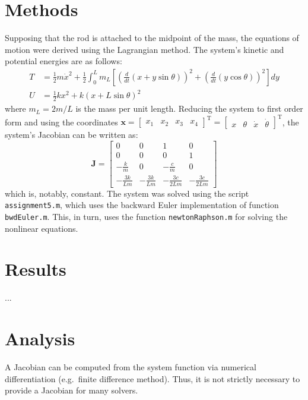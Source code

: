 \documentclass{article}
\begin{document}
	\section*{Methods}
	Supposing that the rod is attached to the midpoint of the mass, the equations of motion were derived using the Lagrangian method. The system's kinetic and potential energies are as follows:
	\begin{equation}
		\begin{aligned}
		T &= \frac{1}{2} m \dot{x}^2 + \frac{1}{2} \int_{0}^{L} m_L \left[ \left( \frac{d}{dt} (x + y \sin \theta) \right)^2 + \left( \frac{d}{dt} (y \cos \theta) \right)^2 \right] dy \\
		U &= \frac{1}{2} k x^2 + k (x + L \sin \theta)^2
		\end{aligned}
	\end{equation}
	where $m_L = 2 m / L$ is the mass per unit length. Reducing the system to first order form and using the coordinates $\bm{x} = \begin{bmatrix} x_1 & x_2 & x_3 & x_4 \end{bmatrix}^\text{T} = \begin{bmatrix} x & \theta & \dot{x} & \dot{\theta} \end{bmatrix}^\text{T}$, the system's Jacobian can be written as:
	\begin{equation}
		\mathbf{J} = \begin{bmatrix}
		0 & 0 & 1 & 0 \\
		0 & 0 & 0 & 1 \\
		-\frac{k}{m} & 0 & -\frac{c}{m} & 0 \\
		-\frac{3 k}{L m} & -\frac{3 k}{L m} & -\frac{3 c}{2 L m} & -\frac{3 c}{2 L m}
		\end{bmatrix}
	\end{equation}
	which is, notably, constant. The system was solved using the script \texttt{assignment5.m}, which uses the backward Euler implementation of function \texttt{bwdEuler.m}. This, in turn, uses the function \texttt{newtonRaphson.m} for solving the nonlinear equations.
	
	\section*{Results}
	...

	\section*{Analysis}
	A Jacobian can be computed from the system function via numerical differentiation (e.g.~finite difference method). Thus, it is not strictly necessary to provide a Jacobian for many solvers.
	
\end{document}
